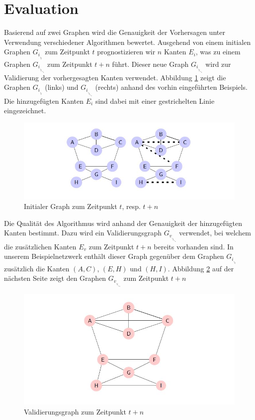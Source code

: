 \section{Evaluation}
Basierend auf zwei Graphen wird die Genauigkeit der Vorhersagen unter Verwendung verschiedener Algorithmen bewertet.
Ausgehend von einem initialen Graphen $G_i_,_t$ zum Zeitpunkt $t$ prognostizieren wir $n$ Kanten $E_i$, was zu einem Graphen $G_i_,_t_+_n$ zum Zeitpunkt $t + n$ führt.
Dieser neue Graph $G_i_,_t_+_n$  wird zur Validierung der vorhergesagten Kanten verwendet.
Abbildung \ref{fig:graph_init} zeigt die Graphen $G_i_,_t$ (links) und $G_i_,_t_+_n$ (rechts) anhand des vorhin eingeführten Beispiels.
Die hinzugefügten Kanten $E_i$ sind dabei mit einer gestrichelten Linie eingezeichnet.

\begin{figure}[h]
    \centering
    \includegraphics{resources/graph_init.JPG}
    \caption{Initialer Graph zum Zeitpunkt $t$, resp. $t + n$}
    \label{fig:graph_init}
\end{figure}

Die Qualität des Algorithmus wird anhand der Genauigkeit der hinzugefügten Kanten bestimmt.
Dazu wird ein Validierungsgraph $G_v_,_t_+_n$ verwendet, bei welchem die zusätzlichen Kanten $E_v$ zum Zeitpunkt $t + n$ bereits vorhanden sind.
In unserem Beispielnetzwerk enthält dieser Graph gegenüber dem Graphen $G_i_,_t$ zusätzlich die Kanten $(A,C)$, $(E,H)$ und $(H,I)$.
Abbildung \ref{fig:graph_validation} auf der nächsten Seite zeigt den Graphen $G_v_,_t_+_n$ zum Zeitpunkt $t + n$

\begin{figure}[h]
    \centering
    \includegraphics{resources/graph_validation.JPG}
    \caption{Validierungsgraph zum Zeitpunkt $t + n$}
    \label{fig:graph_validation}
\end{figure}

